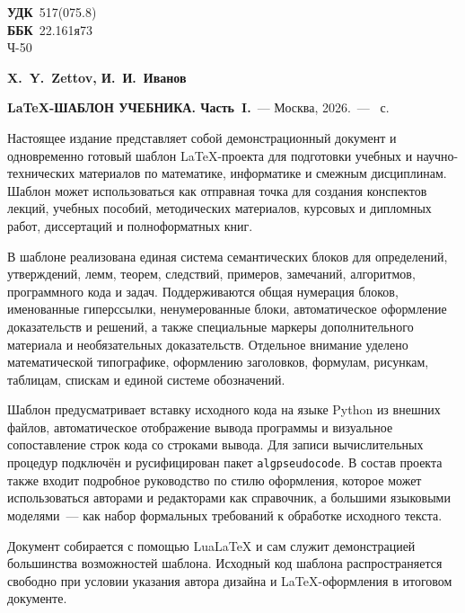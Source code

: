 \clearpage
\thispagestyle{empty}

\begingroup
\sffamily
\footnotesize
\setlength{\parindent}{0pt}
\setlength{\parskip}{0.6em plus 0.2em minus 0.1em}

\noindent
\textbf{УДК}~517(075.8)\\
\textbf{ББК}~22.161я73\\
Ч-50

\vspace{1.4em}

{\bfseries X.~Y.~Zettov, И.~И.~Иванов}

\vspace{0.4em}

{\bfseries \LaTeX-ШАБЛОН УЧЕБНИКА. Часть~I.}~--- Москва, 2026.~--- \pageref*{LastPage}~с.

\vspace{1.4em}

Настоящее издание представляет собой демонстрационный документ и одновременно готовый шаблон \LaTeX-проекта для подготовки учебных и научно-технических материалов по математике, информатике и смежным дисциплинам.
Шаблон может использоваться как отправная точка для создания конспектов лекций, учебных пособий, методических материалов, курсовых и дипломных работ, диссертаций и полноформатных книг.

В шаблоне реализована единая система семантических блоков для определений, утверждений, лемм, теорем, следствий, примеров, замечаний, алгоритмов, программного кода и задач.
Поддерживаются общая нумерация блоков, именованные гиперссылки, ненумерованные блоки, автоматическое оформление доказательств и решений, а также специальные маркеры дополнительного материала и необязательных доказательств.
Отдельное внимание уделено математической типографике, оформлению заголовков, формулам, рисункам, таблицам, спискам и единой системе обозначений.

Шаблон предусматривает вставку исходного кода на языке Python из внешних файлов, автоматическое отображение вывода программы и визуальное сопоставление строк кода со строками вывода.
Для записи вычислительных процедур подключён и русифицирован пакет \texttt{algpseudocode}.
В состав проекта также входит подробное руководство по стилю оформления, которое может использоваться авторами и редакторами как справочник, а большими языковыми моделями~--- как набор формальных требований к обработке исходного текста.

Документ собирается с помощью LuaLaTeX и сам служит демонстрацией большинства возможностей шаблона.
Исходный код шаблона распространяется свободно при условии указания автора дизайна и \LaTeX-оформления в итоговом документе.

